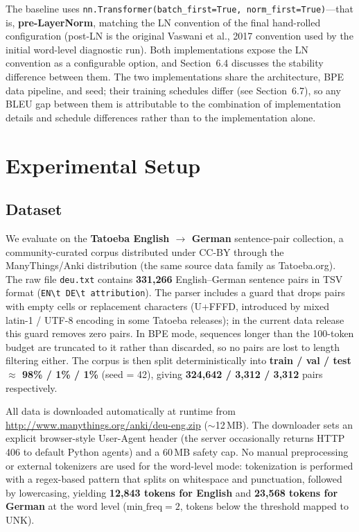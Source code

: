 \documentclass[10pt]{article}
\begin{document}
The baseline uses \texttt{nn.Transformer(batch\_first=True, norm\_first=True)}---that is, \textbf{pre-LayerNorm}, matching the LN convention of the final hand-rolled configuration (post-LN is the original Vaswani et al., 2017 convention used by the initial word-level diagnostic run). Both implementations expose the LN convention as a configurable option, and Section~6.4 discusses the stability difference between them. The two implementations share the architecture, BPE data pipeline, and seed; their training schedules differ (see Section~6.7), so any BLEU gap between them is attributable to the combination of implementation details and schedule differences rather than to the implementation alone.

\section{Experimental Setup}

\subsection{Dataset}

We evaluate on the \textbf{Tatoeba English $\rightarrow$ German} sentence-pair collection, a community-curated corpus distributed under CC-BY through the ManyThings/Anki distribution (the same source data family as Tatoeba.org). The raw file \texttt{deu.txt} contains \textbf{331,266} English--German sentence pairs in TSV format (\texttt{EN\textbackslash t DE\textbackslash t attribution}). The parser includes a guard that drops pairs with empty cells or replacement characters (U+FFFD, introduced by mixed latin-1 / UTF-8 encoding in some Tatoeba releases); in the current data release this guard removes zero pairs. In BPE mode, sequences longer than the 100-token budget are truncated to it rather than discarded, so no pairs are lost to length filtering either. The corpus is then split deterministically into \textbf{train / val / test $\approx$ 98\% / 1\% / 1\%} (seed = 42), giving \textbf{324,642 / 3,312 / 3,312} pairs respectively.

All data is downloaded automatically at runtime from \url{http://www.manythings.org/anki/deu-eng.zip} ($\sim$12\,MB). The downloader sets an explicit browser-style User-Agent header (the server occasionally returns HTTP 406 to default Python agents) and a 60\,MB safety cap. No manual preprocessing or external tokenizers are used for the word-level mode: tokenization is performed with a regex-based pattern that splits on whitespace and punctuation, followed by lowercasing, yielding \textbf{12,843 tokens for English} and \textbf{23,568 tokens for German} at the word level ($\text{min\_freq} = 2$, tokens below the threshold mapped to UNK).
\end{document}
